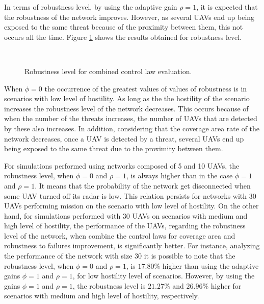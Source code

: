 In terms of robustness level, by using the adaptive gain $\rho=1$, it is expected that the robustness of the network improves. However, as several UAVs end up being exposed to the same threat because of the proximity between them, this not occurs all the time.  Figure \ref{fig:unstructuredRobustnessRadarOn} shows the results obtained for robustness level. 

\begin{figure}[hbt!]
      \centering            
         \\ \centering
      \caption{Robustness level for combined control law evaluation.}
      \label{fig:unstructuredRobustnessRadarOn}
\end{figure}

When $\phi=0$ the occurrence of the greatest values of values of robustness is in scenarios with low level of hostility. As long as the the hostility of the scenario increases the robustness level of the network decreases. This occurs because of when the number of the threats increases, the number of UAVs that are detected by these also increases. In addition, considering that the coverage area rate of the network decreases, once a UAV is detected by a threat, several UAVs end up being exposed to the same threat due to the proximity between them. 

For simulations performed using networks composed of 5 and 10 UAVs, the robustness level, when $\phi=0$ and $\rho=1$, is always higher than in the case $\phi=1$ and $\rho=1$. It means that the probability of the network get disconnected when some UAV turned off its radar is low. This relation persists for networks with 30 UAVs performing mission on the scenario with low level of hostility. On the other hand, for simulations performed with 30 UAVs on scenarios with medium and high level of hostility, the performance of the UAVs, regarding the robustness level of the network, when combine the control laws for coverage area and robustness to failures improvement, is significantly better. For instance, analyzing the performance of the network with size 30 it is possible to note that the robustness level, when $\phi=0$ and $\rho=1$, is $17.80\%$ higher than using the adaptive gains $\phi=1$ and $\rho=1$, for low hostility level of scenarios. However, by using the gains $\phi=1$ and $\rho=1$, the robustness level is $21.27\%$ and $26.96\%$ higher for scenarios with medium and high level of hostility, respectively.

